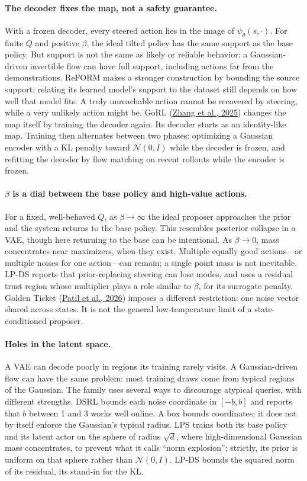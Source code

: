 \paragraph{The decoder fixes the map, not a safety guarantee.} With a frozen decoder, every steered action lies in the image of $\psi_\theta(s, \cdot)$. For finite $Q$ and positive $\beta$, the ideal tilted policy has the same support as the base policy. But support is not the same as likely or reliable behavior: a Gaussian-driven invertible flow can have full support, including actions far from the demonstrations. ReFORM makes a stronger construction by bounding the source support; relating its learned model's support to the dataset still depends on how well that model fits. A truly unreachable action cannot be recovered by steering, while a very unlikely action might be. GoRL (\hyperlink{ref:9}{Zhang et al., 2025}) changes the map itself by training the decoder again. Its decoder starts as an identity-like map. Training then alternates between two phases: optimizing a Gaussian encoder with a KL penalty toward $\mathcal{N}(0, I)$ while the decoder is frozen, and refitting the decoder by flow matching on recent rollouts while the encoder is frozen.

\paragraph{$\beta$ is a dial between the base policy and high-value actions.} For a fixed, well-behaved $Q$, as $\beta \to \infty$ the ideal proposer approaches the prior and the system returns to the base policy. This resembles posterior collapse in a VAE, though here returning to the base can be intentional. As $\beta \to 0$, mass concentrates near maximizers, when they exist. Multiple equally good actions---or multiple noises for one action---can remain; a single point mass is not inevitable. LP-DS reports that prior-replacing steering can lose modes, and uses a residual trust region whose multiplier plays a role similar to $\beta$, for its surrogate penalty. Golden Ticket (\hyperlink{ref:17}{Patil et al., 2026}) imposes a different restriction: one noise vector shared across states. It is not the general low-temperature limit of a state-conditioned proposer.

\paragraph{Holes in the latent space.} A VAE can decode poorly in regions its training rarely visits. A Gaussian-driven flow can have the same problem: most training draws come from typical regions of the Gaussian. The family uses several ways to discourage atypical queries, with different strengths. DSRL bounds each noise coordinate in $[-b,b]$ and reports that $b$ between 1 and 3 works well online. A box bounds coordinates; it does not by itself enforce the Gaussian's typical radius. LPS trains both its base policy and its latent actor on the sphere of radius $\sqrt{d}$, where high-dimensional Gaussian mass concentrates, to prevent what it calls ``norm explosion''; strictly, its prior is uniform on that sphere rather than $\mathcal{N}(0, I)$. LP-DS bounds the squared norm of its residual, its stand-in for the KL.

